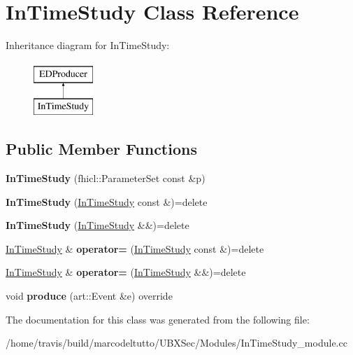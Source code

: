 \hypertarget{classInTimeStudy}{\section{In\-Time\-Study Class Reference}
\label{classInTimeStudy}
}
Inheritance diagram for In\-Time\-Study\-:\begin{figure}[H]
\begin{center}
\leavevmode
\includegraphics[height=2.000000cm]{classInTimeStudy}
\end{center}
\end{figure}
\subsection*{Public Member Functions}
\begin{DoxyCompactItemize}
\item 
\hypertarget{classInTimeStudy_a18b079ba859a54b8e1f8ba51d892d6fd}{{\bfseries In\-Time\-Study} (fhicl\-::\-Parameter\-Set const \&p)}\label{classInTimeStudy_a18b079ba859a54b8e1f8ba51d892d6fd}

\item 
\hypertarget{classInTimeStudy_aa3264279e4e0edf12fb139e8b978b37e}{{\bfseries In\-Time\-Study} (\hyperlink{classInTimeStudy}{In\-Time\-Study} const \&)=delete}\label{classInTimeStudy_aa3264279e4e0edf12fb139e8b978b37e}

\item 
\hypertarget{classInTimeStudy_ad6431c74900cc4a247507e6a23a26343}{{\bfseries In\-Time\-Study} (\hyperlink{classInTimeStudy}{In\-Time\-Study} \&\&)=delete}\label{classInTimeStudy_ad6431c74900cc4a247507e6a23a26343}

\item 
\hypertarget{classInTimeStudy_a0026e03030429752375b4e81f3be2916}{\hyperlink{classInTimeStudy}{In\-Time\-Study} \& {\bfseries operator=} (\hyperlink{classInTimeStudy}{In\-Time\-Study} const \&)=delete}\label{classInTimeStudy_a0026e03030429752375b4e81f3be2916}

\item 
\hypertarget{classInTimeStudy_a766809f898b3f9d2665a252d4fe53fae}{\hyperlink{classInTimeStudy}{In\-Time\-Study} \& {\bfseries operator=} (\hyperlink{classInTimeStudy}{In\-Time\-Study} \&\&)=delete}\label{classInTimeStudy_a766809f898b3f9d2665a252d4fe53fae}

\item 
\hypertarget{classInTimeStudy_a432c6479ed6d3d77ff5b38a23e4330fc}{void {\bfseries produce} (art\-::\-Event \&e) override}\label{classInTimeStudy_a432c6479ed6d3d77ff5b38a23e4330fc}

\end{DoxyCompactItemize}


The documentation for this class was generated from the following file\-:\begin{DoxyCompactItemize}
\item 
/home/travis/build/marcodeltutto/\-U\-B\-X\-Sec/\-Modules/In\-Time\-Study\-\_\-module.\-cc\end{DoxyCompactItemize}
